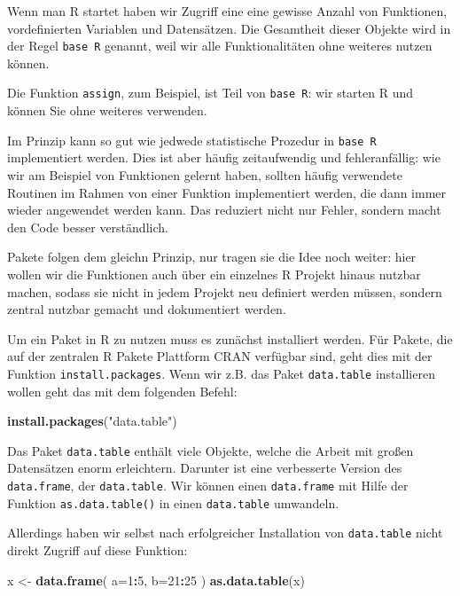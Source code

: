 \documentclass[]{book}
\newenvironment{Shaded}{\begin{snugshade}}{\end{snugshade}}
\newcommand{\KeywordTok}[1]{\textcolor[rgb]{0.13,0.29,0.53}{\textbf{#1}}}
\newcommand{\DataTypeTok}[1]{\textcolor[rgb]{0.13,0.29,0.53}{#1}}
\newcommand{\DecValTok}[1]{\textcolor[rgb]{0.00,0.00,0.81}{#1}}
\newcommand{\StringTok}[1]{\textcolor[rgb]{0.31,0.60,0.02}{#1}}
\newcommand{\OperatorTok}[1]{\textcolor[rgb]{0.81,0.36,0.00}{\textbf{#1}}}
\newcommand{\NormalTok}[1]{#1}
\begin{document}
Wenn man R startet haben wir Zugriff eine eine gewisse Anzahl von
Funktionen, vordefinierten Variablen und Datensätzen. Die Gesamtheit
dieser Objekte wird in der Regel \texttt{base\ R} genannt, weil wir alle
Funktionalitäten ohne weiteres nutzen können.

Die Funktion \texttt{assign}, zum Beispiel, ist Teil von
\texttt{base\ R}: wir starten R und können Sie ohne weiteres verwenden.

Im Prinzip kann so gut wie jedwede statistische Prozedur in
\texttt{base\ R} implementiert werden. Dies ist aber häufig
zeitaufwendig und fehleranfällig: wie wir am Beispiel von Funktionen
gelernt haben, sollten häufig verwendete Routinen im Rahmen von einer
Funktion implementiert werden, die dann immer wieder angewendet werden
kann. Das reduziert nicht nur Fehler, sondern macht den Code besser
verständlich.

Pakete folgen dem gleichn Prinzip, nur tragen sie die Idee noch weiter:
hier wollen wir die Funktionen auch über ein einzelnes R Projekt hinaus
nutzbar machen, sodass sie nicht in jedem Projekt neu definiert werden
müssen, sondern zentral nutzbar gemacht und dokumentiert werden.

Um ein Paket in R zu nutzen muss es zunächst installiert werden. Für
Pakete, die auf der zentralen R Pakete Plattform CRAN verfügbar sind,
geht dies mit der Funktion \texttt{install.packages}. Wenn wir z.B. das
Paket \texttt{data.table} installieren wollen geht das mit dem folgenden
Befehl:

\begin{Shaded}
\begin{Highlighting}[]
\KeywordTok{install.packages}\NormalTok{(}\StringTok{"data.table"}\NormalTok{)}
\end{Highlighting}
\end{Shaded}

Das Paket \texttt{data.table} enthält viele Objekte, welche die Arbeit
mit großen Datensätzen enorm erleichtern. Darunter ist eine verbesserte
Version des \texttt{data.frame}, der \texttt{data.table}. Wir können
einen \texttt{data.frame} mit Hilfe der Funktion
\texttt{as.data.table()} in einen \texttt{data.table} umwandeln.

Allerdings haben wir selbst nach erfolgreicher Installation von
\texttt{data.table} nicht direkt Zugriff auf diese Funktion:

\begin{Shaded}
\begin{Highlighting}[]
\NormalTok{x <-}\StringTok{ }\KeywordTok{data.frame}\NormalTok{(}
  \DataTypeTok{a=}\DecValTok{1}\OperatorTok{:}\DecValTok{5}\NormalTok{,}
  \DataTypeTok{b=}\DecValTok{21}\OperatorTok{:}\DecValTok{25}
\NormalTok{)}
\KeywordTok{as.data.table}\NormalTok{(x)}
\end{Highlighting}
\end{Shaded}
\end{document}
